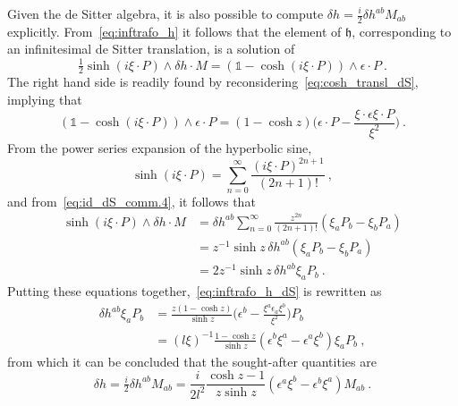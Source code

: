 \documentclass[11pt]{article}
\begin{document}
\blankline
Given the de Sitter algebra, it is also possible to compute 
$\delta h = \tfrac{i}{2} \delta h^{ab} M_{ab}$ explicitly.  
From~\eqref{eq:inftrafo_h} it follows that the element of 
$\mathfrak{h}$, corresponding to an infinitesimal de Sitter 
translation, is a solution of
%
\begin{equation}\label{eq:inftrafo_h_dS}
	\tfrac{1}{2} \sinh(i\xi\cdot P) \wedge \delta h \cdot M = 
	(\mathbb{1}-\cosh(i\xi\cdot P)) \wedge \epsilon\cdot P~.
\end{equation}
The right hand side is readily found by 
reconsidering~\eqref{eq:cosh_transl_dS}, implying that
%
\begin{displaymath}
	(\mathbb{1} - \cosh(i\xi\cdot P)) \wedge \epsilon\cdot P
	= (1 - \cosh z)\bigg(\epsilon\cdot P - \frac{\xi\cdot\epsilon 
		\xi\cdot P}{\xi^2}\bigg)~.
\end{displaymath}
From the power series expansion of the hyperbolic sine,
%
\begin{displaymath}
	\sinh(i\xi\cdot P) = \sum_{n=0}^\infty \frac{(i\xi\cdot 
		P)^{2n+1}}{(2n+1)!}~,
\end{displaymath}
and from~\eqref{eq:id_dS_comm.4}, it follows that
%
\begin{displaymath}
\begin{split}
	\sinh(i\xi\cdot P) \wedge \delta h \cdot M
	&= \delta h^{ab} \sum_{n=0}^\infty \frac{z^{2n}}{(2n+1)!} 
	(\xi_a P_b - \xi_b P_a ) \\
	&= z^{-1} \sinh z\, \delta h^{ab} (\xi_a P_b - \xi_b P_a ) \\
	&= 2 z^{-1} \sinh z\, \delta h^{ab} \xi_a P_b~.
\end{split}
\end{displaymath}
Putting these equations together,~\eqref{eq:inftrafo_h_dS} is 
rewritten as
%
\begin{displaymath}
\begin{split}
	\delta h^{ab} \xi_a P_b &= \frac{z (1-\cosh z)}{\sinh z} 
	\bigg(\epsilon^b - \frac{\xi^a \epsilon_ a \xi^b}{\xi^2} 
	\bigg)P_b \\
	&= (l\xi)^{-1} \frac{1-\cosh z}{\sinh z} (\epsilon^b\xi^a - 
	\epsilon^a\xi^b) \xi_a P_b~,
\end{split}
\end{displaymath}
from which it can be concluded that the sought-after quantities 
are
\begin{equation}
	\delta h = \tfrac{i}{2}\delta h^{ab} M_{ab} = \frac{i}{2l^2} 
	\frac{\cosh z - 1}{z\sinh z} (\epsilon^a\xi^b - 
	\epsilon^b\xi^a) M_{ab}~.
\end{equation}
\end{document}
